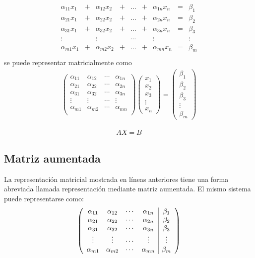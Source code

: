 \begin{align*}
\begin{array}{ccccccccc}
    \alpha_{11} x_1&+&\alpha_{12} x_2&+&\hdots&+&\alpha_{1n} x_n&=&\beta_1\\
    \alpha_{21} x_1&+&\alpha_{22} x_2&+&\hdots&+&\alpha_{2n} x_n&=&\beta_2\\
    \alpha_{31} x_1&+&\alpha_{32} x_2&+&\hdots&+&\alpha_{3n} x_n&=&\beta_3\\
    \vdots&&\vdots&&\cdots&&\vdots&&\vdots\\
    \alpha_{m1} x_1&+&\alpha_{m2} x_2&+&\hdots&+&\alpha_{mn} x_n&=&\beta_m\\
\end{array}
\end{align*} 
se puede representar matricialmente como
\begin{align*}
\begin{pmatrix}
    \alpha_{11} &\alpha_{12} &\cdots&\alpha_{1n} \\
    \alpha_{21} &\alpha_{22} &\cdots&\alpha_{2n} \\
    \alpha_{31} &\alpha_{32} &\cdots&\alpha_{3n} \\
    \vdots&\vdots&\cdots&\vdots\\
    \alpha_{m1} &\alpha_{m2} &\cdots&\alpha_{mn}\\
\end{pmatrix}
\begin{pmatrix}
    x_1\\x_2\\x_3\\\vdots\\x_n
\end{pmatrix}
=
\begin{pmatrix}
    \beta_1\\\beta_2\\\beta_3\\\vdots\\\beta_m
\end{pmatrix}
\end{align*}

\begin{align*}
AX=B
\end{align*}
\subsection{Matriz aumentada}
La representación matricial mostrada en líneas anteriores tiene una forma abreviada llamada representación mediante matriz aumentada. El mismo sistema puede representarse como:
\begin{align*}
\reducir{cccc|c}{
\alpha_{11} &\alpha_{12} &\cdots&\alpha_{1n}&\beta_1 \\
\alpha_{21} &\alpha_{22} &\cdots&\alpha_{2n}&\beta_2 \\
\alpha_{31} &\alpha_{32} &\cdots&\alpha_{3n}&\beta_3 \\
\vdots&\vdots&\cdots&\vdots&\vdots\\
\alpha_{m1} &\alpha_{m2} &\cdots&\alpha_{mn}&\beta_m\\
}
\end{align*}


